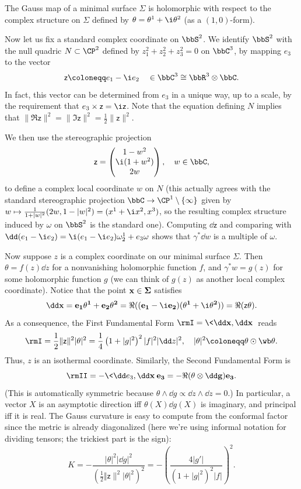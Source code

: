 \begin{cor}
    The Gauss map of a minimal surface $\Sigma$ is holomorphic with respect to the complex structure on $\Sigma$ defined by $\theta=\theta^1+\i \theta^2$ (as a $(1,0)$-form).
\end{cor}

Now let us fix a standard complex coordinate on $\bbS^2$. We identify $\bbS^2$ with the null quadric $N\subset \CP^2$ defined by $z_1^2+z_2^2+z_3^2=0$ on $\bbC^3$, by mapping $e_3$ to the vector 
\[\mathsf{z}\coloneqq e_1-\i e_2 \quad \in\bbC^3\cong \bbR^3\otimes\bbC.\]
In fact, this vector can be determined from $e_3$ in a unique way, up to a scale, by the requirement that $e_3\times \mathsf{z}=\i \mathsf{z}$. Note that the equation defining $N$ implies that $\lVert\Re \mathsf{z}\rVert^2=\lVert\Im \mathsf{z}\rVert^2=\frac12\lVert \mathsf{z}\rVert^2$.

We then use the stereographic projection 
\[\mathsf{z}=\begin{pmatrix}
    1-w^2\\ \i(1+w^2)\\ 2w
\end{pmatrix},\quad w\in\bbC,\]
to define a complex local coordinate $w$ on $N$ (this actually agrees with the standard stereographic projection $\bbC\to \CP^1\setminus\{\infty\}$ given by $w\mapsto \frac{1}{1+|w|^2}(2w,1-|w|^2)=(x^1+\i x^2,x^3)$, so the resulting complex structure induced by $\omega$ on $\bbS^2$ is the standard one). Computing $\dd\mathsf{z}$ and comparing with $\dd(e_1-\i e_2)=\i(e_1-\i e_2)\omega^1_2+e_3\omega$ shows that $\gamma^\ast\dd w$ is a multiple of $\omega$.

Now suppose $z$ is a complex coordinate on our minimal surface $\Sigma$. Then $\theta=f(z)\dd z$ for a nonvanishing holomorphic function $f$, and $\gamma^\ast w=g(z)$ for some holomorphic function $g$ (we can think of $g(z)$ as another local complex coordinate). Notice that the point $\bf{x}\in \Sigma$ satisfies 
\[\dd \bf{x}=e_1\theta^1+e_2\theta^2=\Re((e_1-\i e_2)(\theta^1+\i \theta^2))=\Re(\mathsf{z}\theta).\]
As a consequence, the First Fundamental Form $\rmI=\<\dd\bf{x},\dd\bf{x}\>$ reads 
\[\rmI=\frac12\lVert\mathsf{z}\rVert^2 |\theta|^2=\frac14 \left(1+|g|^2\right)^2 |f|^2 |\dd z|^2,\quad |\theta|^2\coloneqq \theta\odot\wb\theta.\]
Thus, $z$ is an isothermal coordinate. Similarly, the Second Fundamental Form is 
\[\rmII=-\<\dd e_3,\dd\bf{x}\>e_3=-\Re(\theta \otimes \dd g)e_3.\]
(This is automatically symmetric because $\theta\wedge\dd g\propto \dd z\wedge\dd z=0$.)
In particular, a vector $X$ is an asymptotic direction iff $\theta(X)\dd g(X)$ is imaginary, and principal iff it is real. The Gauss curvature is easy to compute from the conformal factor since the metric is already diagonalized (here we're using informal notation for dividing tensors; the trickiest part is the sign):
\[K=-\frac{|\theta|^2|\dd g|^2}{\left(\frac12\Vert \mathsf{z}\rVert^2 |\theta|^2\right)^2}=-\left(\frac{4|g'|}{(1+|g|^2)^2|f|}\right)^2.\]

